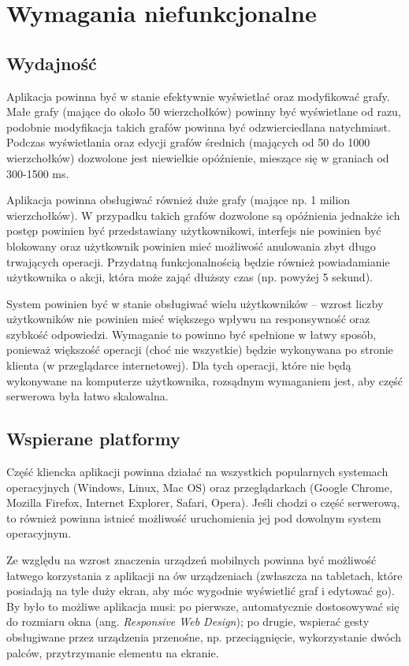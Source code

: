 \section{Wymagania niefunkcjonalne}

\subsection{Wydajność}

Aplikacja powinna być w stanie efektywnie wyświetlać oraz modyfikować grafy. Małe grafy (mające do około 50 wierzchołków) powinny być wyświetlane od razu, podobnie modyfikacja takich grafów powinna być odzwierciedlana natychmiast. Podczas wyświetlania oraz edycji grafów średnich (mających od 50 do 1000 wierzchołków) dozwolone jest niewielkie opóźnienie, mieszące się w graniach od 300-1500 ms. 

Aplikacja powinna obsługiwać również duże grafy (mające np. 1 milion wierzchołków). W przypadku takich grafów dozwolone są opóźnienia jednakże ich postęp powinien być przedstawiany użytkownikowi, interfejs nie powinien być blokowany oraz użytkownik powinien mieć możliwość anulowania zbyt długo trwających operacji. Przydatną funkcjonalnością będzie również powiadamianie użytkownika o akcji, która może zająć dłuższy czas (np. powyżej 5 sekund).

System powinien być w stanie obsługiwać wielu użytkowników -- wzrost liczby użytkowników nie powinien mieć większego wpływu na responsywność oraz szybkość odpowiedzi. Wymaganie to powinno być spełnione w łatwy sposób, ponieważ większość operacji (choć nie wszystkie) będzie wykonywana po stronie klienta (w przeglądarce internetowej). Dla tych operacji, które nie będą wykonywane na komputerze użytkownika, rozsądnym wymaganiem jest, aby część serwerowa była łatwo skalowalna.

\subsection{Wspierane platformy}

Część kliencka aplikacji powinna działać na wszystkich popularnych systemach operacyjnych (Windows, Linux, Mac OS) oraz przeglądarkach (Google Chrome, Mozilla Firefox, Internet Explorer, Safari, Opera). Jeśli chodzi o część serwerową, to również powinna istnieć możliwość uruchomienia jej pod dowolnym system operacyjnym.

Ze względu na wzrost znaczenia urządzeń mobilnych powinna być możliwość łatwego korzystania z aplikacji na ów urządzeniach (zwłaszcza na tabletach, które posiadają na tyle duży ekran, aby móc wygodnie wyświetlić graf i edytować go). By było to możliwe aplikacja musi: po pierwsze, automatycznie dostosowywać się do rozmiaru okna (ang. \textit{Responsive Web Design}); po drugie, wspierać gesty obsługiwane przez urządzenia przenośne, np. przeciągnięcie, wykorzystanie dwóch palców, przytrzymanie elementu na ekranie. 

